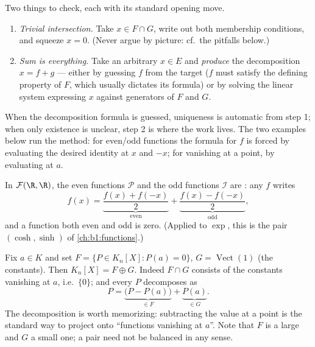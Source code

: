 \begin{method}[Proving $E = F \oplus G$]
\label{met:b1:vspaces:directsum}
Two things to check, each with its standard opening move.
\begin{enumerate}
  \item \emph{Trivial intersection.} Take $x \in F \cap G$,
        write out both membership conditions, and squeeze $x =
        0$. (Never argue by picture: cf.\ the pitfalls below.)
  \item \emph{Sum is everything.} Take an arbitrary $x \in E$
        and \emph{produce} the decomposition $x = f + g$ ---
        either by guessing $f$ from the target ($f$ must satisfy
        the defining property of $F$, which usually dictates its
        formula) or by solving the linear system expressing $x$
        against generators of $F$ and $G$.
\end{enumerate}
When the decomposition formula is guessed, uniqueness is
automatic from step 1; when only existence is unclear, step 2 is
where the work lives. The two examples below run the method: for
even/odd functions the formula for $f$ is forced by evaluating
the desired identity at $x$ and $-x$; for  vanishing
at a point, by evaluating at $a$.
\end{method}

\begin{example}\label{ex:b1:vspaces:evenodd}
In $\mathcal{F}(\R, \R)$, the even functions $\mathcal{P}$ and the
odd functions $\mathcal{I}$ are : any $f$ writes
\[
f(x) = \underbrace{\frac{f(x) + f(-x)}{2}}_{\text{even}}
+ \underbrace{\frac{f(x) - f(-x)}{2}}_{\text{odd}},
\]
and a function both even and odd is zero. (Applied to $\exp$, this
is the pair $(\cosh, \sinh)$ of \cref{ch:b1:functions}.)
\end{example}

\begin{example}
\label{ex:b1:vspaces:hyperplane}
Fix $a \in K$ and set $F = \{P \in K_n[X] : P(a) = 0\}$, $G =
\operatorname{Vect}(1)$ (the constants). Then $K_n[X] = F \oplus
G$. Indeed $F \cap G$ consists of the constants vanishing at $a$,
i.e.\ $\{0\}$; and every $P$ decomposes as
\[
P = \underbrace{\bigl(P - P(a)\bigr)}_{\in F}
+ \underbrace{P(a)}_{\in G} .
\]
The decomposition is worth memorizing: subtracting the value at a
point is the standard way to project onto ``functions vanishing at
$a$''. Note that $F$ is a large  and $G$ a small one; a
 pair need not be balanced in any sense.
\end{example}

